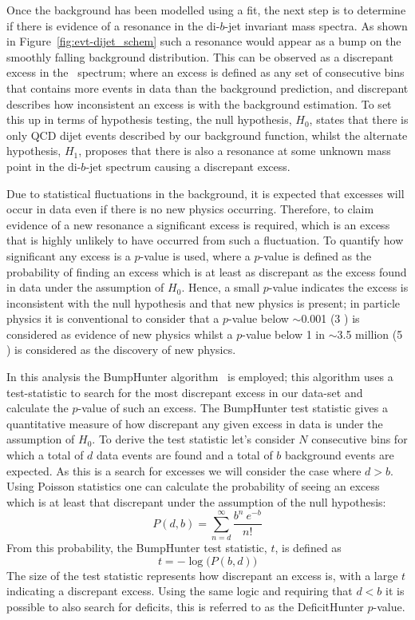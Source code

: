 Once the background has been modelled using a fit, the next step is to determine
if there is evidence of a resonance in the di-$b$-jet invariant mass spectra.
As shown in Figure~\ref{fig:evt-dijet_schem} such a resonance would appear as a bump on the smoothly falling background distribution.
This can be observed as a discrepant excess in the~\mjj{} spectrum;
where an excess is defined as any set of consecutive bins that contains
more events in data than the background prediction,
and discrepant describes how inconsistent an excess is with the background estimation.
To set this up in terms of hypothesis testing, the null hypothesis, $H_0$,
states that there is only QCD dijet events described by our background function,
whilst the alternate hypothesis, $H_1$, proposes that there is also a resonance at some
unknown mass point in the di-$b$-jet spectrum causing a discrepant excess.

Due to statistical fluctuations in the background,
it is expected that excesses will occur in data even if there is no new physics occurring.
Therefore, to claim evidence of a new resonance a significant excess is required,
which is an excess that is highly unlikely to have occurred from such a fluctuation.
To quantify how significant any excess is a \mbox{$p$-value} is used,
where a \mbox{$p$-value} is defined as the probability of finding an excess which is at least as discrepant as the excess found in data
under the assumption of $H_0$.
Hence, a small \mbox{$p$-value} indicates the excess is inconsistent with the null hypothesis and that new physics is present;
in particle physics it is conventional to consider that a \mbox{$p$-value} below $\sim$0.001 (3 \sigma) is considered as evidence of new physics
whilst a \mbox{$p$-value} below 1 in $\sim$3.5 million (5 \sigma) is considered as the discovery of new physics.

In this analysis the {\sc BumpHunter} algorithm~\cite{dibjet-bh} is employed;
this algorithm uses a test-statistic to 
search for the most discrepant excess in our data-set
and calculate the \mbox{$p$-value} of such an excess.
The BumpHunter test statistic gives a quantitative measure of how discrepant any given excess in data is
under the assumption of $H_0$.
To derive the test statistic let's consider $N$ consecutive bins for which
a total of $d$ data events are found and a total of $b$ background events are expected.
As this is a search for excesses we will consider the case where $d > b$.
Using Poisson statistics one can calculate the probability of seeing an excess which is at least that discrepant
under the assumption of the null hypothesis:
\begin{equation}
  P(d,b) = \sum_{n=d}^{\infty} \frac{b^n~e^{-b}}{n!}
\end{equation}
From this probability, the BumpHunter test statistic, $t$, is defined as
\begin{equation}
 t = -\log{\big(P(b,d)\big)}
\end{equation}
The size of the test statistic represents how discrepant an excess is,
with a large $t$ indicating a discrepant excess.
Using the same logic and requiring that $d < b$ it is possible to also search for deficits,
this is referred to as the DeficitHunter \mbox{$p$-value}.

